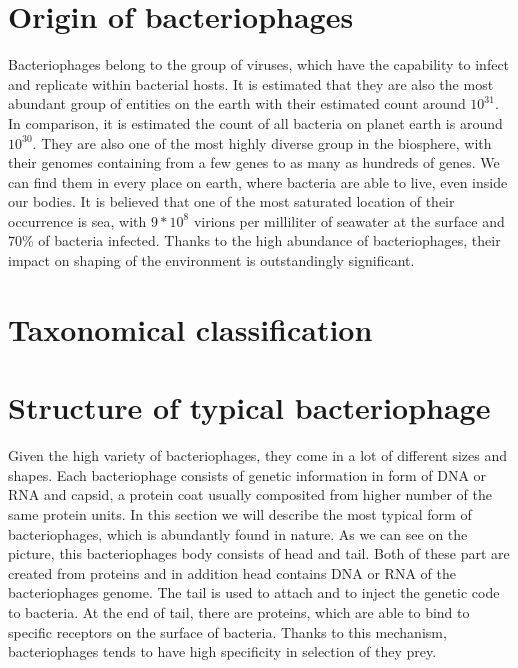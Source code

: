 \section{Origin of bacteriophages}
Bacteriophages belong to the group of viruses, which have the capability to infect and replicate within bacterial hosts.
It is estimated that they are also the most abundant group of entities on the earth with their estimated count around $10^{31}$.
In comparison, it is estimated the count of all bacteria on planet earth is around $10^{30}$.
They are also one of the most highly diverse group in the biosphere, with their genomes containing from a few genes to as many as hundreds of genes.
We can find them in every place on earth, where bacteria are able to live, even inside our bodies.
It is believed that one of the most saturated location of their occurrence is sea, with $9*10^{8}$ virions per milliliter of seawater at the surface and 70\% of bacteria infected. %
Thanks to the high abundance of bacteriophages, their impact on shaping of the environment is outstandingly significant.

\section{Taxonomical classification}

\section{Structure of typical bacteriophage}
Given the high variety of bacteriophages, they come in a lot of different sizes and shapes.
Each bacteriophage consists of genetic information in form of DNA or RNA and capsid, a protein coat usually composited from higher number of the same protein units.
In this section we will describe the most typical form of bacteriophages, which is abundantly found in nature.
As we can see on the picture, this bacteriophages body consists of head and tail.
Both of these part are created from proteins and in addition head contains DNA or RNA of the bacteriophages genome.
The tail is used to attach and to inject the genetic code to bacteria.
At the end of tail, there are proteins, which are able to bind to specific receptors on the surface of bacteria.
Thanks to this mechanism, bacteriophages tends to have high specificity in selection of they prey.

